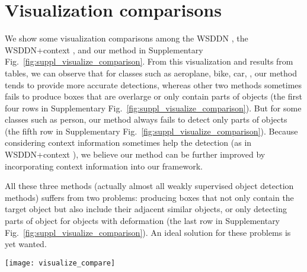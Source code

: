 \documentclass[10pt,twocolumn,letterpaper]{article}
\begin{document}
\section{Visualization comparisons}

We show some visualization comparisons among the WSDDN \cite{Ref:Bilen2016}, the WSDDN+context \cite{Ref:Kantorov2016}, and our method in Supplementary Fig.~\ref{fig:suppl_visualize_comparison}.
From this visualization and results from tables, we can observe that for classes such as aeroplane, bike, car, \etc, our method tends to provide more accurate detections, whereas other two methods sometimes fails to produce boxes that are overlarge or only contain parts of objects (the first four rows in Supplementary Fig.~\ref{fig:suppl_visualize_comparison}).
But for some classes such as person, our method always fails to detect only parts of objects (the fifth row in Supplementary Fig.~\ref{fig:suppl_visualize_comparison}).
Because considering context information sometimes help the detection (as in WSDDN+context \cite{Ref:Kantorov2016}), we believe our method can be further improved by incorporating context information into our framework.

All these three methods (actually almost all weakly supervised object detection methods) suffers from two problems: producing boxes that not only contain the target object but also include their adjacent similar objects, or only detecting parts of object for objects with deformation (the last row in Supplementary Fig.~\ref{fig:suppl_visualize_comparison}).
An ideal solution for these problems is yet wanted.


\begin{figure*}[!t]
\begin{center}
   \texttt{[image: visualize\_compare]}
\end{center}
   \caption{Some visualization comparisons among the WSDDN \cite{Ref:Bilen2016}, the WSDDN+context \cite{Ref:Kantorov2016}, and our method (OICR).
   Green rectangle indicates success cases (IoU$>$0.5), red rectangle indicates failure cases (IoU$<$0.5), and yellow rectangle indicates ground truths.
   The first four rows show examples that our method outperforms other two methods (with larger IoU).
   The fifth row shows examples that our method is worse than other two methods (with smaller IoU).
   The last row shows failure examples for both three methods.
   }
\label{fig:suppl_visualize_comparison}
\end{figure*}
\end{document}
